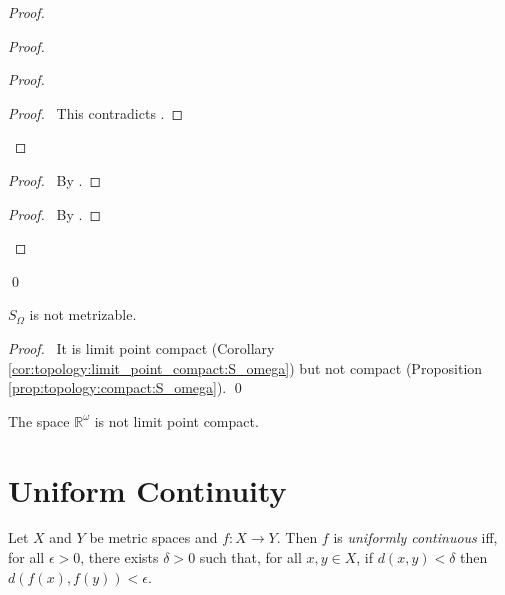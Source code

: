 \begin{proof}
\begin{proof}
\begin{proof}
      \qedstep
      \begin{proof}
        \pf\ This contradicts .
      \end{proof}
    \end{proof}
    \begin{proof}
      \pf\ By .
    \end{proof}
    \begin{proof}
      \pf\ By .
    \end{proof}
  \end{proof}
  \qed
\end{proof}

\begin{cor}
 $S_\Omega$ is not metrizable.
\end{cor}

\begin{proof}
 \pf\ It is limit point compact (Corollary
\ref{cor:topology:limit_point_compact:S_omega}) but not compact (Proposition
\ref{prop:topology:compact:S_omega}). \qed
\end{proof}

\begin{cor}
  The space $\mathbb{R}^\omega$ is not limit point compact.
\end{cor}

\section{Uniform Continuity}

\begin{df}
  Let $X$ and $Y$ be metric spaces and $f : X \rightarrow Y$. Then $f$ is
  \emph{uniformly continuous} iff, for all $\epsilon > 0$, there exists
  $\delta > 0$ such that, for all $x, y \in X$, if $d(x, y) < \delta$ then
  $d(f(x), f(y)) < \epsilon$.
\end{df}

